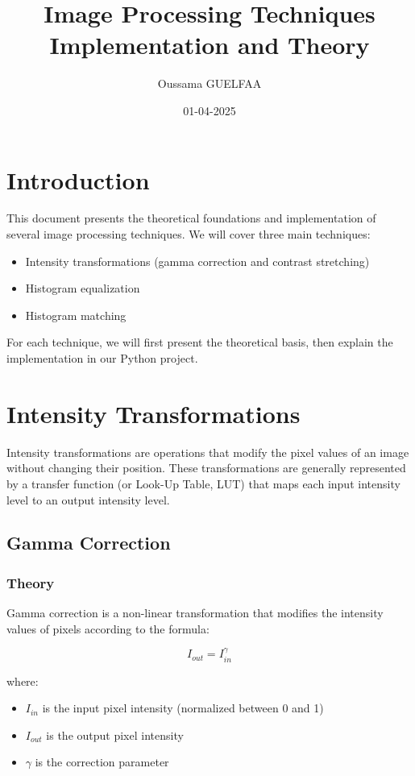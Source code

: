 \documentclass[12pt,a4paper]{article}
\title{Image Processing Techniques\\
\large Implementation and Theory}
\author{Oussama GUELFAA}
\date{01-04-2025}
\begin{document}
\maketitle
\tableofcontents
\newpage

\section{Introduction}

This document presents the theoretical foundations and implementation of several image processing techniques. We will cover three main techniques:
\begin{itemize}
    \item Intensity transformations (gamma correction and contrast stretching)
    \item Histogram equalization
    \item Histogram matching
\end{itemize}

For each technique, we will first present the theoretical basis, then explain the implementation in our Python project.

\section{Intensity Transformations}

Intensity transformations are operations that modify the pixel values of an image without changing their position. These transformations are generally represented by a transfer function (or Look-Up Table, LUT) that maps each input intensity level to an output intensity level.

\subsection{Gamma Correction}

\subsubsection{Theory}

Gamma correction is a non-linear transformation that modifies the intensity values of pixels according to the formula:

\begin{equation}
    I_{out} = I_{in}^{\gamma}
\end{equation}

where:
\begin{itemize}
    \item $I_{in}$ is the input pixel intensity (normalized between 0 and 1)
    \item $I_{out}$ is the output pixel intensity
    \item $\gamma$ is the correction parameter
\end{itemize}
\end{document}
